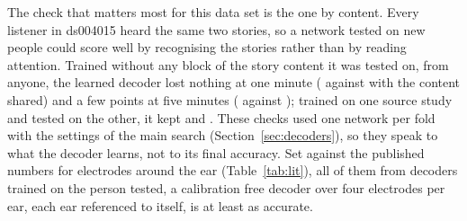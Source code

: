 The check that matters most for this data set is the one by content. Every listener in ds004015 heard the same two stories, so a network tested on new people could score well by recognising the stories rather than by reading attention. Trained without any block of the story content it was tested on, from anyone, the learned decoder lost nothing at one minute (\heldContentSixty{} against \heldStandardSixty{} with the content shared) and a few points at five minutes (\heldContentFiveMin{} against \heldStandardFiveMin{}); trained on one source study and tested on the other, it kept \heldStudySixty{} and \heldStudyFiveMin{}. These checks used one network per fold with the settings of the main search (Section~\ref{sec:decoders}), so they speak to what the decoder learns, not to its final accuracy. Set against the published numbers for electrodes around the ear (Table~\ref{tab:lit}), all of them from decoders trained on the person tested, a calibration free decoder over four electrodes per ear, each ear referenced to itself, is at least as accurate.
